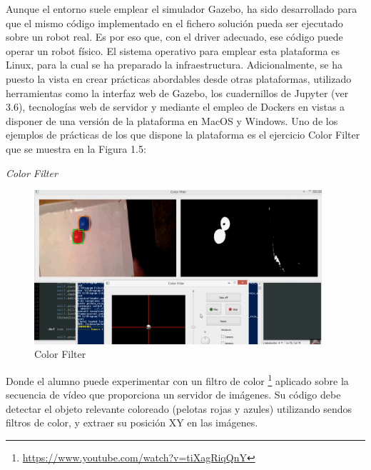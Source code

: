 Aunque el entorno suele emplear el simulador Gazebo, ha sido desarrollado para que el mismo código implementado en el fichero solución pueda ser ejecutado sobre un robot real. Es por eso que, con el driver adecuado, ese código puede operar un robot físico. El sistema operativo para emplear esta plataforma es Linux, para la cual se ha preparado la infraestructura. Adicionalmente, se ha puesto la vista en crear prácticas abordables desde otras plataformas, utilizado herramientas como la interfaz web de Gazebo, los cuadernillos de Jupyter (ver 3.6), tecnologías web de servidor y mediante el empleo de Dockers en vistas a disponer de una versión de la plataforma en MacOS y Windows.
Uno de los ejemplos de prácticas de los que dispone la plataforma es el ejercicio Color Filter que se muestra en la Figura 1.5:

\hspace{0.4\linewidth}
\textit{Color Filter}

\begin{figure}[H]
  \begin{center}
    \includegraphics[width=0.95\textwidth]{figures/color_filter.png}
		\caption{Color Filter}
		\label{fig.colorfilter}
		\end{center}
\end{figure}

Donde el alumno puede experimentar con un filtro de color \footnote{\url{https://www.youtube.com/watch?v=tiXagRiqQnY}} aplicado sobre la secuencia de vídeo que proporciona un servidor de imágenes. Su código debe detectar el objeto relevante coloreado (pelotas rojas y azules) utilizando sendos filtros de color, y extraer su posición XY en las imágenes. 

